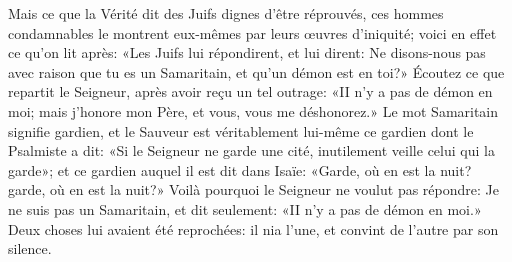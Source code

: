  Mais ce que la Vérité dit des Juifs dignes d’être réprouvés,
	ces hommes condamnables le montrent eux-mêmes par leurs œuvres d’iniquité;
	voici en effet ce qu’on lit après:
	«Les Juifs lui répondirent, et lui dirent:
	Ne disons-nous pas avec raison que tu es un Samaritain,
	et qu’un démon est en toi?»
Écoutez ce que repartit le Seigneur, après avoir reçu un tel outrage:
	«II n’y a pas de démon en moi;
	mais j’honore mon Père, et vous, vous me déshonorez.»
Le mot Samaritain signifie gardien,
	et le Sauveur est véritablement lui-même ce gardien dont le Psalmiste a dit:
	«Si le Seigneur ne garde une cité, inutilement veille celui qui la garde»;
	et ce gardien auquel il est dit dans Isaïe:
	«Garde, où en est la nuit? garde, où en est la nuit?»
Voilà pourquoi le Seigneur ne voulut pas répondre: Je ne suis pas un Samaritain,
	et dit seulement: «II n’y a pas de démon en moi.»
Deux choses lui avaient été reprochées:
	il nia l’une, et convint de l’autre par son silence.
